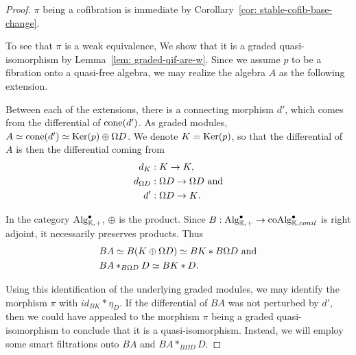 \documentclass[../thesis.tex]{subfiles}
\begin{document}
            \begin{proof}
                $\pi$ being a cofibration is immediate by Corollary~\ref{cor: stable-cofib-base-change}. 
                
                To see that $\pi$ is a weak equivalence, We show that it is a graded quasi-isomorphism by Lemma~\ref{lem: graded-qif-are-w}. Since we assume $p$ to be a fibration onto a quasi-free algebra, we may realize the algebra $A$ as the following extension.
                \begin{center}
                \end{center}
                Between each of the extensions, there is a connecting morphism $d'$, which comes from the differential of $\tt{cone}(d')$. As graded modules, $A \simeq \tt{cone}(d') \simeq \tt{Ker}(p) \oplus \Omega D$. We denote $K = \tt{Ker}(p)$, so that the differential of $A$ is then the differential coming from 
                \begin{align*}
                    d_K & : K \rightarrow K, \\
                    d_{\Omega D} & : \Omega D \rightarrow \Omega D \tt{ and} \\
                    d' & : \Omega D \rightarrow K\tt{.}
                \end{align*}

                In the category $\tt{Alg}_{\mathbb{K},+}^\bullet$, $\oplus$ is the product. Since $B : \tt{Alg}_{\mathbb{K},+}^\bullet \rightarrow \tt{coAlg}_{\mathbb{K}, conil}^\bullet$ is right adjoint, it necessarily preserves products. Thus
                \begin{align*}
                    & BA\simeq B(K\oplus \Omega D) \simeq BK \ast B\Omega D \tt{ and} \\
                    & BA \ast_{B\Omega D} D \simeq BK \ast D\tt{.}
                \end{align*}
                
                Using this identification of the underlying graded modules, we may identify the morphism $\pi$ with $id_{BK} \ast \eta_D$. If the differential of $BA$ was not perturbed by $d'$, then we could have appealed to the morphism $\pi$ being a graded quasi-isomorphism to conclude that it is a quasi-isomorphism. Instead, we will employ some smart filtrations onto $BA$ and $BA \ast_{B\Omega D}D$.


\end{proof}
\end{document}
